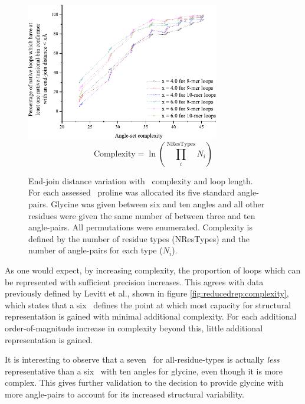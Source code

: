 \begin{figure}[hptb]
\begin{center}
\includegraphics[width=0.75\textwidth]{05-ReducedRep/conformer/end-join.pdf}
\vspace{0.25cm}
\begin{equation}
\text{Complexity} = \ln \left( \prod_i^\text{NResTypes} N_i \right)
\end{equation}
\end{center}
\caption[End-join distance variation with \angleset\ complexity and loop length]{End-join distance variation with \angleset\ complexity and loop 
length.\\For each assessed \angleset\ proline was allocated its five standard angle-pairs. Glycine was given between six and ten angles and all 
other residues were given the same number of between three and ten angle-pairs. All permutations were enumerated. Complexity is defined by the number of residue types (NResTypes) and the number of angle-pairs for each type ($N_i$).}
\label{fig:reduced_rep:end-join}
\end{figure}

As one would expect, by increasing complexity, the proportion of loops which can be represented with sufficient precision increases. This agrees with data  previously defined by Levitt et al.\cite{METHOD:ParkLevitt}, shown in figure \ref{fig:reducedrep:complexity}, which states that a six \angleset\ defines the point at which most capacity for structural representation is gained with minimal additional complexity.
For each additional order-of-magnitude increase in complexity beyond this, little additional representation is gained.


It is interesting to observe  that a seven \angleset\ for all-residue-types is actually  \emph{less} representative than a six \angleset\ with ten angles for glycine, even though it is more complex. This gives further validation to the decision to provide glycine with more angle-pairs to account for its increased structural variability.


